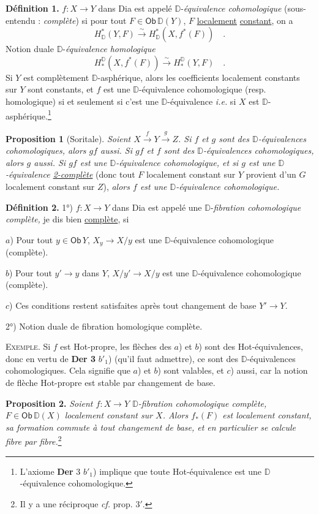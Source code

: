 \documentclass[11pt]{article}
\newcommand{\printedpage}[1]{\marginpar{\footnotesize p.~#1}}
\newcommand{\msp}[1]{\marginpar{\footnotesize [#1]}}
\newcommand{\Hot}{\textsf{Hot}}
\newcommand{\Dia}{\textsf{Dia}}
\newcommand{\Ob}{\textsf{Ob}}
\newcommand{\DD}{\mathbb{D}}
\begin{document}
\msp{page 101}
\textbf{Définition 1.} $f : X \to Y$ dans \Dia{} est appelé $\DD$-\textit{équivalence cohomologique} (sous-entendu : \textit{complète}) si pour tout $F \in \Ob\,\DD(Y)$, $F$ \underline{localement} \underline{constant}, on a
\[
H^*_{\DD}(Y,F) \overset{\sim}{\longrightarrow} H^*_{\DD}(X, f^*(F)) \quad .
\]
Notion duale $\DD$-\textit{équivalence homologique}
\[
H_*^{\DD}(X, f^*(F)) \overset{\sim}{\longrightarrow} H_*^{\DD}(Y,F) \quad .
\]
Si $Y$ est complètement $\DD$-asphérique, alors les coefficients localement constants sur $Y$ sont constants, et $f$ est une $\DD$-équivalence cohomologique (resp. homologique) si et seulement si c’est une $\DD$-équivalence \textit{i.e.} si $X$ est $\DD$-asphérique.\footnote[53]{L’axiome \textbf{Der} 3 $b'_1$) implique que toute \Hot-équivalence est une $\DD$-équivalence cohomologique.}

\textbf{Proposition 1} (Soritale). \textit{Soient $X \overset{f}{\to} Y \overset{g}{\to} Z$. Si $f$ et $g$ sont des $\DD$-équivalences cohomologiques, alors $gf$ aussi. Si $gf$ et $f$ sont des $\DD$-équivalences cohomologiques, alors $g$ aussi. Si $gf$ est une $\DD$-équivalence cohomologique, et si $g$ est une $\DD$-équivalence \underline{2-complète}} (donc tout $F$ localement constant sur $Y$ provient d’un $G$ localement constant sur $Z$), \textit{alors $f$ est une $\DD$-équivalence cohomologique.}

\textbf{Définition 2.} 1°) $f : X \to Y$ dans \Dia{} est appelé une $\DD$-\textit{fibration cohomologique complète,} je dis bien \underline{complète}, si

$a$) Pour tout $y \in \Ob\, Y$, $X_y \to X/y$ est une $\DD$-équivalence cohomologique (complète).

$b$) Pour tout $y' \to y$ dans $Y$, $X/y' \to X/y$ est une $\DD$-équivalence cohomologique (complète).

\printedpage{62}

\msp{page 102}
$c$) Ces conditions restent satisfaites après tout changement de base $Y' \to Y$.

2°) Notion duale de fibration homologique complète.

\textsc{Exemple.} Si $f$ est \Hot-propre, les flèches des $a$) et $b$) sont des \Hot-équivalences, donc en vertu de \textbf{Der 3} $b'_1$) (qu’il faut admettre), ce sont des $\DD$-équivalences cohomologiques. Cela signifie que $a$) et $b$) sont valables, et $c$) aussi, car la notion de flèche \Hot-propre est stable par changement de base.

\textbf{Proposition 2.} \textit{Soient $f : X \to Y$ $\DD$-fibration cohomologique complète, $F \in \Ob\,\DD(X)$ localement constant sur $X$. Alors $f_*(F)$ est localement constant, sa formation commute à tout changement de base, et en particulier se calcule fibre par fibre.}\footnote[54]{Il y a une réciproque \textit{cf.} prop. 3$'$.}
\end{document}
